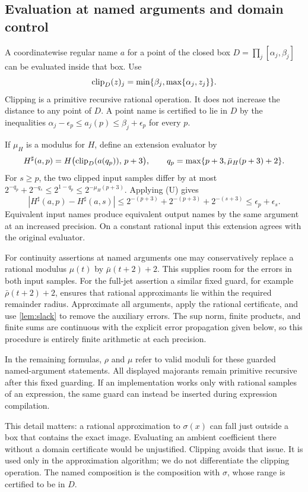 \subsection{Evaluation at named arguments and domain control}\label{sec:composition-eval}

A coordinatewise regular name $a$ for a point of the closed box
$D=\prod_j[\alpha_j,\beta_j]$ can be evaluated inside that box. Use
\[
 \operatorname{clip}_D(z)_j=\min\{\beta_j,\max\{\alpha_j,z_j\}\}.
\]
Clipping is a primitive recursive rational operation. It does not increase
the distance to any point of $D$. A point name is certified to lie in $D$
by the inequalities
$\alpha_j-\epsilon_p\le a_j(p)\le\beta_j+\epsilon_p$ for every $p$.

If $\mu_H$ is a modulus for $H$, define an extension evaluator by
\begin{equation}\label{eq:extension}
 H^\sharp(a,p)=H\bigl(\operatorname{clip}_D(a(q_p)),\,p+3\bigr),\qquad
 q_p=\max\{p+3,\bar\mu_H(p+3)+2\}.
\end{equation}
For $s\ge p$, the two clipped input samples differ by at most
$2^{-q_p}+2^{-q_s}\le2^{1-q_p}\le2^{-\mu_H(p+3)}$.
Applying (U) gives
\[
 |H^\sharp(a,p)-H^\sharp(a,s)|
 \le2^{-(p+3)}+2^{-(p+3)}+2^{-(s+3)}
 \le\epsilon_p+\epsilon_s.
\]
Equivalent input names produce equivalent output names by the same
argument at an increased precision. On a constant rational input this
extension agrees with the original evaluator.

For continuity assertions at named arguments one may conservatively replace
a rational modulus $\mu(t)$ by $\bar\mu(t+2)+2$. This supplies room for
the errors in both input samples. For the full-jet assertion a similar
fixed guard, for example $\bar\rho(t+2)+2$, ensures that rational
approximants lie within the required remainder radius. Approximate all
arguments, apply the rational certificate, and use \cref{lem:slack} to
remove the auxiliary errors. The sup norm, finite products, and finite sums
are continuous with the explicit error propagation given below, so this
procedure is entirely finite arithmetic at each precision.

In the remaining formulas, $\rho$ and $\mu$ refer to valid moduli for
these guarded named-argument statements. All displayed majorants remain
primitive recursive after this fixed guarding. If an implementation works
only with rational samples of an expression, the same guard can instead be
inserted during expression compilation.

This detail matters: a rational approximation to $\sigma(x)$ can fall just
outside a box that contains the exact image. Evaluating an ambient
coefficient there without a domain certificate would be unjustified.
Clipping avoids that issue. It is used only in the approximation algorithm;
we do not differentiate the clipping operation. The named composition is
the composition with $\sigma$, whose range is certified to be in $D$.

